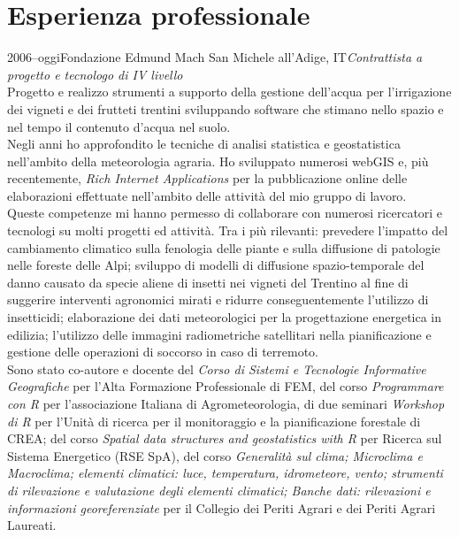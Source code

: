 \documentclass{curriculum}
\begin{document}
    \section{Esperienza professionale}
    \begin{entrylist}
    \entry 
        {2006--oggi}{Fondazione Edmund Mach} {San Michele all'Adige, IT}{\emph{Contrattista a progetto e tecnologo di IV livello}\hfill\vspace{3pt}\\
        Progetto e realizzo strumenti a supporto della gestione dell'acqua per l'irrigazione dei vigneti e dei frutteti trentini sviluppando software che stimano nello spazio e nel tempo il contenuto d'acqua nel suolo.
        \\Negli anni ho approfondito le tecniche di analisi statistica e geostatistica nell'ambito della meteorologia agraria. Ho sviluppato numerosi webGIS e, più recentemente, \textit{Rich Internet Applications} per la pubblicazione online delle elaborazioni effettuate nell'ambito delle attività del mio gruppo di lavoro.\\
        Queste competenze mi hanno permesso di collaborare con numerosi ricercatori e tecnologi su molti progetti ed attività. Tra i più rilevanti: prevedere l'impatto del cambiamento climatico sulla fenologia delle piante e sulla diffusione di patologie nelle foreste delle Alpi; sviluppo di modelli di diffusione spazio-temporale del danno causato da specie aliene di insetti nei vigneti del Trentino al fine di suggerire interventi agronomici mirati e ridurre conseguentemente l'utilizzo di insetticidi; elaborazione dei dati meteorologici per la progettazione energetica in edilizia; l'utilizzo delle immagini radiometriche satellitari nella pianificazione e gestione delle operazioni di soccorso in caso di terremoto. \\ 
        Sono stato co-autore e docente del \textit{Corso di Sistemi e Tecnologie In\-for\-ma\-ti\-ve Geo\-gra\-fi\-che} per l'Alta Formazione Professionale di FEM, del corso \textit{Programmare con R} per l'as\-so\-cia\-zio\-ne Italiana di A\-gro\-me\-te\-o\-ro\-lo\-gi\-a, di due seminari \textit{Workshop di R} per l'Unità di ricerca per il monitoraggio e la pianificazione forestale di CREA; del corso \textit{Spatial data structures and geostatistics with R} per Ricerca sul Sistema Energetico (RSE SpA), del corso \textit{Generalità sul clima; Microclima e Macroclima; elementi climatici: luce, temperatura, idrometeore, vento; strumenti di rilevazione e valutazione degli elementi climatici; Banche dati: rilevazioni e informazioni georeferenziate} per il Collegio dei Periti Agrari e dei Periti Agrari Laureati.}
    \end{entrylist}
    
\end{document}
